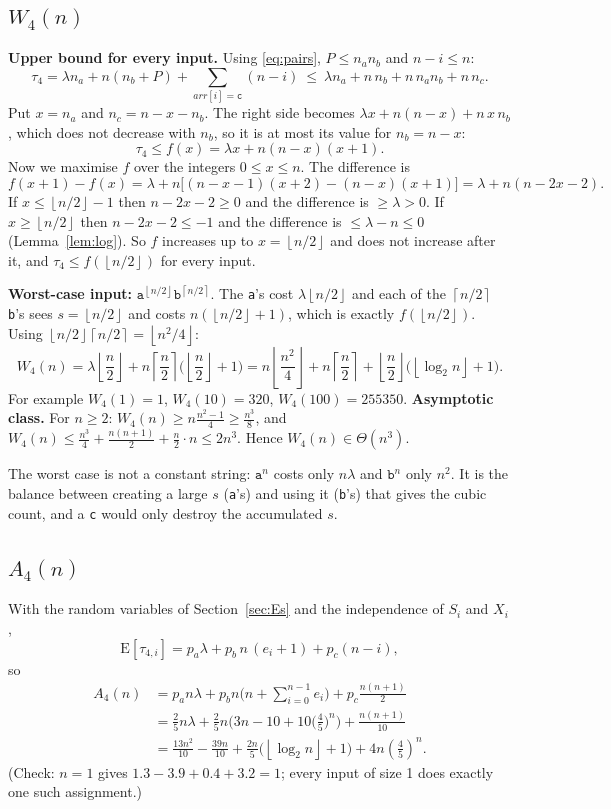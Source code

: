 \documentclass[11pt]{article}
\theoremstyle{remark}
\newcommand{\fl}[1]{\left\lfloor #1\right\rfloor}
\newcommand{\cl}[1]{\left\lceil #1\right\rceil}
\newcommand{\E}{\mathrm{E}}
\newcommand{\ta}{\texttt{a}}
\newcommand{\tb}{\texttt{b}}
\newcommand{\tc}{\texttt{c}}
\begin{document}
\subsection{$W_4(n)$}
\textbf{Upper bound for every input.} Using \eqref{eq:pairs}, $P\le n_an_b$ and $n-i\le n$:
\[
\tau_4=\lambda n_a+n(n_b+P)+\sum_{arr[i]=\tc}(n-i)\ \le\ \lambda n_a+n\,n_b+n\,n_an_b+n\,n_c .
\]
Put $x=n_a$ and $n_c=n-x-n_b$. The right side becomes $\lambda x+n(n-x)+n\,x\,n_b$, which does not decrease with $n_b$,
so it is at most its value for $n_b=n-x$:
\[
\tau_4\le f(x)=\lambda x+n(n-x)(x+1).
\]
Now we maximise $f$ over the integers $0\le x\le n$. The difference is
\[
f(x+1)-f(x)=\lambda+n\big[(n-x-1)(x+2)-(n-x)(x+1)\big]=\lambda+n(n-2x-2).
\]
If $x\le\fl{n/2}-1$ then $n-2x-2\ge0$ and the difference is $\ge\lambda>0$. If $x\ge\fl{n/2}$ then $n-2x-2\le-1$ and
the difference is $\le\lambda-n\le0$ (Lemma~\ref{lem:log}). So $f$ increases up to $x=\fl{n/2}$ and does not increase
after it, and $\tau_4\le f(\fl{n/2})$ for every input.

\textbf{Worst-case input:} $\ta^{\fl{n/2}}\tb^{\cl{n/2}}$. The \ta's cost $\lambda\fl{n/2}$ and each of the $\cl{n/2}$
\tb's sees $s=\fl{n/2}$ and costs $n(\fl{n/2}+1)$, which is exactly $f(\fl{n/2})$. Using
$\fl{n/2}\cl{n/2}=\fl{n^2/4}$:
\[
W_4(n)=\lambda\fl{\frac n2}+n\cl{\frac n2}\Big(\fl{\frac n2}+1\Big)
=n\fl{\frac{n^2}{4}}+n\cl{\frac n2}+\fl{\frac n2}\big(\fl{\log_2 n}+1\big).
\]
For example $W_4(1)=1$, $W_4(10)=320$, $W_4(100)=255350$.
\textbf{Asymptotic class.} For $n\ge2$: $W_4(n)\ge n\frac{n^2-1}{4}\ge\frac{n^3}{8}$, and
$W_4(n)\le\frac{n^3}{4}+\frac{n(n+1)}{2}+\frac n2\cdot n\le 2n^3$. Hence $W_4(n)\in\Theta(n^3)$.

The worst case is not a constant string: $\ta^n$ costs only $n\lambda$ and $\tb^n$ only $n^2$. It is the balance
between creating a large $s$ (\ta's) and using it (\tb's) that gives the cubic count, and a \tc{} would only destroy the
accumulated $s$.

\subsection{$A_4(n)$}
With the random variables of Section~\ref{sec:Es} and the independence of $S_i$ and $X_i$,
\[
\E[\tau_{4,i}]=p_a\lambda+p_b\,n\,(e_i+1)+p_c(n-i),
\]
so
\begin{align*}
A_4(n)&=p_a n\lambda+p_b n\Big(n+\sum_{i=0}^{n-1}e_i\Big)+p_c\frac{n(n+1)}{2}\\
&=\frac25 n\lambda+\frac25 n\Big(3n-10+10\big(\tfrac45\big)^n\Big)+\frac{n(n+1)}{10}\\
&=\frac{13n^2}{10}-\frac{39n}{10}+\frac{2n}{5}\big(\fl{\log_2 n}+1\big)+4n\left(\frac45\right)^{n}.
\end{align*}
(Check: $n=1$ gives $1.3-3.9+0.4+3.2=1$; every input of size 1 does exactly one such assignment.)
\end{document}

